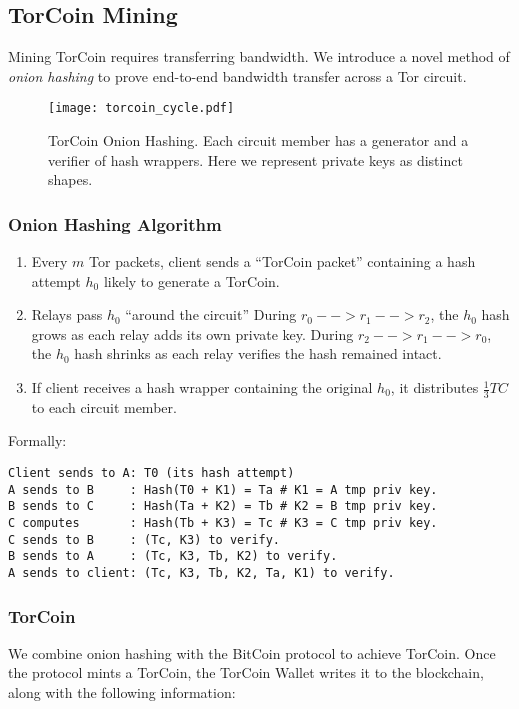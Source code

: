 \subsection{TorCoin Mining}

Mining TorCoin requires transferring bandwidth. We introduce a novel method of \textit{onion hashing} to prove end-to-end bandwidth transfer across a Tor circuit.

\begin{figure}[H]
  \centering
    \texttt{[image: torcoin\_cycle.pdf]}
  \caption{TorCoin Onion Hashing. Each circuit member has a generator and a verifier of hash wrappers. Here we represent private keys as distinct shapes.}
\end{figure}

\subsubsection{Onion Hashing Algorithm}
\begin{enumerate}
\item Every $m$ Tor packets, client sends a ``TorCoin packet'' containing a hash attempt $h_0$ likely to generate a TorCoin.
\item Relays pass $h_0$ ``around the circuit''
\subitem During $r_0 --> r_1 --> r_2$, the $h_0$ hash grows as each relay adds its own private key.
\subitem During $r_2 --> r_1 --> r_0$, the $h_0$ hash shrinks as each relay verifies the hash remained intact.
\item If client receives a hash wrapper containing the original $h_0$, it distributes $\frac{1}{3} TC$ to each circuit member.
\end{enumerate}

Formally:

\begin{verbatim}
Client sends to A: T0 (its hash attempt)
A sends to B     : Hash(T0 + K1) = Ta # K1 = A tmp priv key.
B sends to C     : Hash(Ta + K2) = Tb # K2 = B tmp priv key.
C computes       : Hash(Tb + K3) = Tc # K3 = C tmp priv key.
C sends to B     : (Tc, K3) to verify.
B sends to A     : (Tc, K3, Tb, K2) to verify.
A sends to client: (Tc, K3, Tb, K2, Ta, K1) to verify.
\end{verbatim}

\subsubsection{TorCoin}
We combine onion hashing with the BitCoin protocol to achieve TorCoin. Once the protocol mints a TorCoin, the TorCoin Wallet writes it to the blockchain, along with the following information:

